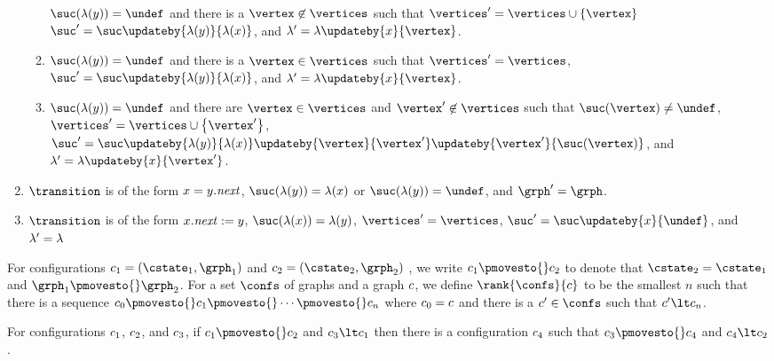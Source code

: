 \begin{enumerate}
\begin{enumerate}
\label{nass4}
$\suc(\labeling(\yvar))=\undef$ and
there is a $\vertex\not\in\vertices$ such that
$\vertices'=\vertices\cup\set{\vertex}$ 
$\suc'=\suc\updateby{\labeling(\yvar)}{\labeling(\xvar)}$, 
and $\labeling'=\labeling\updateby{\xvar}{\vertex}$.
\item
\label{nass5}
$\suc(\labeling(\yvar))=\undef$ and
there is a $\vertex\in\vertices$ such that
$\vertices'=\vertices$,
$\suc'=\suc\updateby{\labeling(\yvar)}{\labeling(\xvar)}$, and 
$\labeling'=\labeling\updateby{\xvar}{\vertex}$.
\item
\label{nass6}
$\suc(\labeling(\yvar))=\undef$ and
there are $\vertex\in\vertices$ and $\vertex'\not\in\vertices$ such that
$\suc(\vertex)\neq\undef$,
$\vertices'=\vertices\cup\set{\vertex'}$,
$\suc'=\suc\updateby{\labeling(\yvar)}{\labeling(\xvar)}\updateby{\vertex}{\vertex'}\updateby{\vertex'}{\suc(\vertex)}$, and
$\labeling'=\labeling\updateby{\xvar}{\vertex'}$.
\end{enumerate}
\item
$\transition$ is of the form $x=y.{\it next}$,
$\suc(\labeling(\yvar))=\labeling(\xvar)$ or $\suc(\labeling(\yvar))=\undef$, and
$\grph'=\grph$.
\item
$\transition$ is of the form $x.{\it next}:=y$,
$\suc(\labeling(\xvar))=\labeling(\yvar)$,
$\vertices'=\vertices$, $\suc'=\suc\updateby{\xvar}{\undef}$, and
$\lambda'=\lambda$
\end{enumerate}
%
For configurations $\conf_1=\tuple{\cstate_1,\grph_1}$ and $\conf_2=\tuple{\cstate_2,\grph_2}$ ,
we write $\conf_1\pmovesto{}\conf_2$ to denote that $\cstate_2=\cstate_1$ and $\grph_1\pmovesto{}\grph_2$.
%
For a set $\confs$ of graphs and a graph $c$, we define $\rank{\confs}{\conf}$
to be the smallest $n$ such that there is a sequence
$\conf_0\pmovesto{}\conf_1\pmovesto{}\cdots\pmovesto{}\conf_n$
where $c_0=c$ and there is a $\conf'\in\confs$ such that $\conf'\lt\conf_n$.


\noindent
\begin{minipage}{0.65\textwidth}
\begin{lemma}
\label{pre:js:monotonic:lemma}
For configurations $c_1$, $c_2$, and $c_3$, if
$\conf_1\pmovesto{}\conf_2$ and $\conf_3\lt\conf_1$ then there
is a configuration $c_4$ such that $\conf_3\pmovesto{}\conf_4$ and
$\conf_4\lt\conf_2$.
\end{lemma}
\end{minipage}
\hfill%
\begin{minipage}{0.3\textwidth}
\end{minipage}


